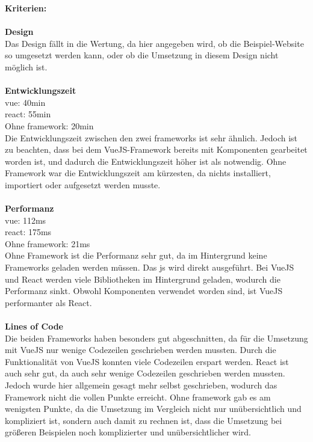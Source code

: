 \textbf{Kriterien:}\\\\
\textbf{Design}\\
Das Design fällt in die Wertung, da hier angegeben wird, ob die Beispiel-Website so umgesetzt werden kann, oder ob die Umsetzung in diesem Design nicht möglich ist.\\\\
\newpage
\textbf{Entwicklungszeit}\\
\Gls{vue}: 40min\\
\Gls{react}: 55min\\
Ohne \Gls{framework}: 20min\\
Die Entwicklungszeit zwischen den zwei \Gls{framework}s ist sehr ähnlich. Jedoch ist zu beachten, dass bei dem VueJS-Framework bereits mit Komponenten gearbeitet worden ist, und dadurch die Entwicklungszeit höher ist als notwendig. Ohne Framework war die Entwicklungszeit am kürzesten, da nichts installiert, importiert oder aufgesetzt werden musste.\\\\
\textbf{Performanz}\\
\Gls{vue}: 112ms\\
\Gls{react}: 175ms\\
Ohne \Gls{framework}: 21ms\\
Ohne Framework ist die Performanz sehr gut, da im Hintergrund keine Frameworks geladen werden müssen. Das \Gls{js} wird direkt ausgeführt. Bei VueJS und React werden viele Bibliotheken im Hintergrund geladen, wodurch die Performanz sinkt. Obwohl Komponenten verwendet worden sind, ist VueJS performanter als React.\\\\
\textbf{Lines of Code}\\
Die beiden Frameworks haben besonders gut abgeschnitten, da für die Umsetzung mit VueJS nur wenige Codezeilen geschrieben werden mussten. Durch die Funktionalität von VueJS konnten viele Codezeilen erspart werden. React ist auch sehr gut, da auch sehr wenige Codezeilen geschrieben werden mussten. Jedoch wurde hier allgemein gesagt mehr selbst geschrieben, wodurch das Framework nicht die vollen Punkte erreicht.
Ohne \Gls{framework} gab es am wenigsten Punkte, da die Umsetzung im Vergleich nicht nur unübersichtlich und kompliziert ist, sondern auch damit zu rechnen ist, dass die Umsetzung bei größeren Beispielen noch komplizierter und unübersichtlicher wird.
\newpage
